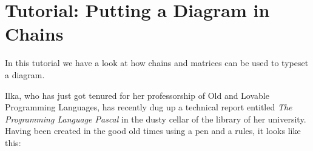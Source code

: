 %
%
%


\section{Tutorial: Putting a Diagram in Chains}

In this tutorial we have a look at how chains and matrices can be used
to typeset a diagram.

Ilka, who has just got tenured for her professorship of Old and
Lovable Programming Languages, has recently dug up a technical report entitled
\emph{The Programming Language Pascal} in the dusty cellar of the
library of her university. Having been created in the good old times
using a pen and a rules, it looks like this:




